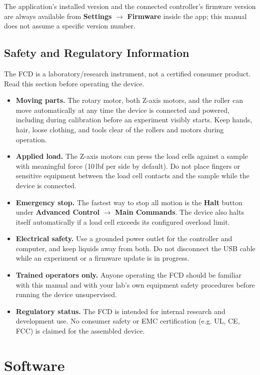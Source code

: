 \documentclass[12pt]{report}
\begin{document}
The application's installed version and the connected controller's firmware version are always available from \textbf{Settings} $\rightarrow$ \textbf{Firmware} inside the app; this manual does not assume a specific version number.

\section{Safety and Regulatory Information}
The FCD is a laboratory/research instrument, not a certified consumer product. Read this section before operating the device.

\begin{itemize}
    \item \textbf{Moving parts.} The rotary motor, both Z-axis motors, and the roller can move automatically at any time the device is connected and powered, including during calibration before an experiment visibly starts. Keep hands, hair, loose clothing, and tools clear of the rollers and motors during operation.
    \item \textbf{Applied load.} The Z-axis motors can press the load cells against a sample with meaningful force (10\,lbf per side by default). Do not place fingers or sensitive equipment between the load cell contacts and the sample while the device is connected.
    \item \textbf{Emergency stop.} The fastest way to stop all motion is the \textbf{Halt} button under \textbf{Advanced Control} $\rightarrow$ \textbf{Main Commands}. The device also halts itself automatically if a load cell exceeds its configured overload limit.
    \item \textbf{Electrical safety.} Use a grounded power outlet for the controller and computer, and keep liquids away from both. Do not disconnect the USB cable while an experiment or a firmware update is in progress.
    \item \textbf{Trained operators only.} Anyone operating the FCD should be familiar with this manual and with your lab's own equipment safety procedures before running the device unsupervised.
    \item \textbf{Regulatory status.} The FCD is intended for internal research and development use. No consumer safety or EMC certification (e.g. UL, CE, FCC) is claimed for the assembled device.
\end{itemize}

\chapter{Software}
\end{document}
